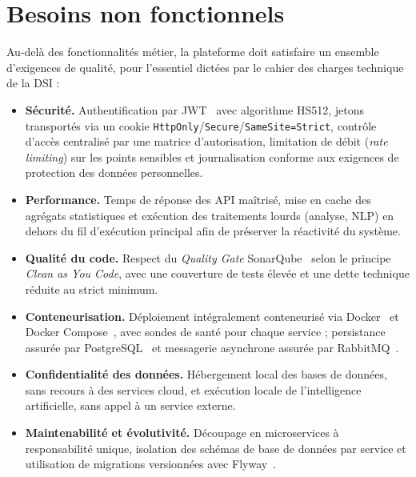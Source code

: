 \documentclass[12pt,a4paper]{report}
\begin{document}
\section{Besoins non fonctionnels}

Au-delà des fonctionnalités métier, la plateforme doit satisfaire un ensemble
d'exigences de qualité, pour l'essentiel dictées par le cahier des charges
technique de la DSI :

\begin{itemize}[leftmargin=1.2cm]
  \item \textbf{Sécurité.} Authentification par JWT~\cite{rfc7519} avec algorithme
  HS512, jetons transportés via un cookie \texttt{HttpOnly}/\texttt{Secure}/\texttt{SameSite=Strict},
  contrôle d'accès centralisé par une matrice d'autorisation, limitation de débit
  (\textit{rate limiting}) sur les points sensibles et journalisation conforme aux
  exigences de protection des données personnelles.

  \item \textbf{Performance.} Temps de réponse des API maîtrisé, mise en cache des
  agrégats statistiques et exécution des traitements lourds (analyse, NLP) en
  dehors du fil d'exécution principal afin de préserver la réactivité du système.

  \item \textbf{Qualité du code.} Respect du \textit{Quality Gate}
  SonarQube~\cite{sonarqube} selon le principe \textit{Clean as You Code}, avec une
  couverture de tests élevée et une dette technique réduite au strict minimum.

  \item \textbf{Conteneurisation.} Déploiement intégralement conteneurisé via
  Docker~\cite{docker} et Docker Compose~\cite{dockercompose}, avec sondes de santé
  pour chaque service ; persistance assurée par PostgreSQL~\cite{postgresql} et
  messagerie asynchrone assurée par RabbitMQ~\cite{rabbitmq}.

  \item \textbf{Confidentialité des données.} Hébergement local des bases de
  données, sans recours à des services cloud, et exécution locale de l'intelligence
  artificielle, sans appel à un service externe.

  \item \textbf{Maintenabilité et évolutivité.} Découpage en microservices à
  responsabilité unique, isolation des schémas de base de données par service et
  utilisation de migrations versionnées avec Flyway~\cite{flyway}.
\end{itemize}
\end{document}

